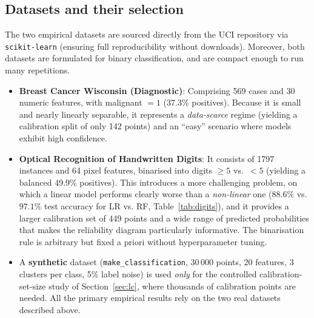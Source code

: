 \documentclass[11pt,a4paper]{article}
\begin{document}
\subsection{Datasets and their selection}
The two empirical datasets are sourced directly from the UCI repository \cite{uci} via \texttt{scikit-learn} \cite{sklearn} (ensuring full reproducibility without downloads). Moreover, both datasets are formulated for binary classification, and are compact enough to run many repetitions.
\begin{itemize}\setlength\itemsep{0pt}
\item \textbf{Breast Cancer Wisconsin (Diagnostic)}: Comprising 569 cases and 30 numeric features, with malignant $=1$ (37.3\% positives). Because it is small and nearly linearly separable, it represents a \emph{data-scarce} regime (yielding a calibration split of only 142 points) and an ``easy'' scenario where models exhibit high confidence.
\item \textbf{Optical Recognition of Handwritten Digits}: It consists of 1797 instances and 64 pixel features, binarised into digits $\ge 5$ vs.\ $<5$ (yielding a balanced 49.9\% positives). This introduces a more challenging problem, on which a linear model performs clearly worse than a \emph{non-linear} one ($88.6\%$ vs. $97.1\%$ test accuracy for LR vs. RF, Table~\ref{tab:digits}), and it provides a larger calibration set of 449 points and a wide range of predicted probabilities that makes the reliability diagram particularly informative. The binarisation rule is arbitrary but fixed a priori without hyperparameter tuning.
\item A \textbf{synthetic} dataset (\texttt{make\_classification}, 30\,000 points, 20 features, 3 clusters per class, 5\% label noise) is used \emph{only} for the controlled calibration-set-size study of Section~\ref{sec:lc}, where thousands of calibration points are needed. All the primary empirical results rely on the two real datasets described above.
\end{itemize}
\end{document}
